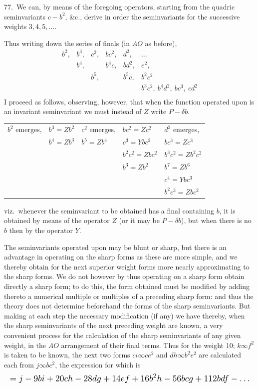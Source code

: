 \documentclass[11pt]{article}
\begin{document}
77.\ We can, by means of the foregoing operators, starting from the quadric seminvariants $c - b^2$, \&c., derive in order the seminvariants for the successive weights $3, 4, 5, \ldots$.

\clearpage
Thus writing down the series of finals (in $AO$ as before),
\[
\begin{array}{cccccc}
b^2, & b^3, & c^2, & bc^2, & d^2, & \ldots \\
& b^4, & & b^4c, & bd^2, & e^2, \\
& & b^5, & & b^5c, & b^2c^2 \\
& & & & & b^3c^2,\ b^4d^2,\ bc^3,\ cd^2 \\
\end{array}
\]
I proceed as follows, observing, however, that when the function operated upon is an invariant seminvariant we must instead of $Z$ write $P - \delta b$.

\begin{center}
\begin{tabular}{l|l|l|l|l}
$b^2$ emerges, & $b^3 = Zb^2$ & $c^2$ emerges, & $bc^2 = Zc^2$ & $d^2$ emerges, \\
              & $b^4 = Zb^3$ & $b^5 = Zb^4$ & $c^3 = Ybc^2$ & $bc^3 = Zc^3$ \\
              &              &              & $b^2c^2 = Zbc^2$ & $b^3c^2 = Zb^2c^2$ \\
              &              &              & $b^3 = Zb^2$    & $b^7 = Zb^6$ \\
              &              &              &                 & $c^4 = Ybc^3$ \\
              &              &              &                 & $b^2c^3 = Zbc^2$ \\
\end{tabular}
\end{center}

viz.\ whenever the seminvariant to be obtained has a final containing $b$, it is obtained by means of the operator $Z$ (or it may be $P - \delta b$), but when there is no $b$ then by the operator $Y$.

The seminvariants operated upon may be blunt or sharp, but there is an advantage in operating on the sharp forms as these are more simple, and we thereby obtain for the next superior weight forms more nearly approximating to the sharp forms. We do not however by thus operating on a sharp form obtain directly a sharp form; to do this, the form obtained must be modified by adding thereto a numerical multiple or multiples of a preceding sharp form: and thus the theory does not determine beforehand the forms of the sharp seminvariants. But making at each step the necessary modification (if any) we have thereby, when the sharp seminvariants of the next preceding weight are known, a very convenient process for the calculation of the sharp seminvariants of any given weight, in the $AO$ arrangement of their final terms. Thus for the weight 10; $k \infty f^2$ is taken to be known, the next two forms $ci \infty ce^2$ and $dh \infty b^2e^2$ are calculated each from $j \infty bc^2$, the expression for which is
\[
\resizebox{\textwidth}{!}{$\displaystyle
= j - 9bi + 20ch - 28dg + 14ef + 16b^2h - 56bcg + 112bdf - \ldots
$}
\]
\end{document}
